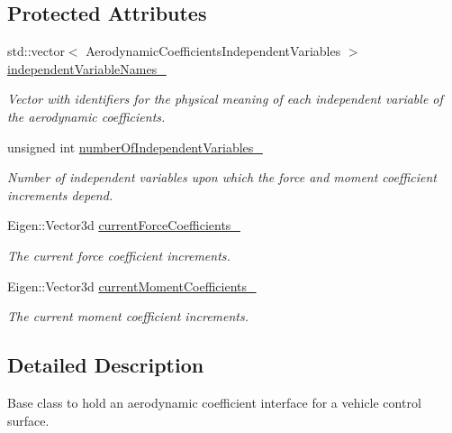 \subsection*{Protected Attributes}
\begin{DoxyCompactItemize}
\item 
std\+::vector$<$ Aerodynamic\+Coefficients\+Independent\+Variables $>$ \hyperlink{classtudat_1_1aerodynamics_1_1ControlSurfaceIncrementAerodynamicInterface_add6d7eb16644057489243d5fbdbbf3cb}{independent\+Variable\+Names\+\_\+}\hypertarget{classtudat_1_1aerodynamics_1_1ControlSurfaceIncrementAerodynamicInterface_add6d7eb16644057489243d5fbdbbf3cb}{}\label{classtudat_1_1aerodynamics_1_1ControlSurfaceIncrementAerodynamicInterface_add6d7eb16644057489243d5fbdbbf3cb}

\begin{DoxyCompactList}\small\item\em Vector with identifiers for the physical meaning of each independent variable of the aerodynamic coefficients. \end{DoxyCompactList}\item 
unsigned int \hyperlink{classtudat_1_1aerodynamics_1_1ControlSurfaceIncrementAerodynamicInterface_ac8d30947065270db44a70ba9344236c2}{number\+Of\+Independent\+Variables\+\_\+}
\begin{DoxyCompactList}\small\item\em Number of independent variables upon which the force and moment coefficient increments depend. \end{DoxyCompactList}\item 
Eigen\+::\+Vector3d \hyperlink{classtudat_1_1aerodynamics_1_1ControlSurfaceIncrementAerodynamicInterface_ab7c7dfdd3e7190abac6021345145bc34}{current\+Force\+Coefficients\+\_\+}
\begin{DoxyCompactList}\small\item\em The current force coefficient increments. \end{DoxyCompactList}\item 
Eigen\+::\+Vector3d \hyperlink{classtudat_1_1aerodynamics_1_1ControlSurfaceIncrementAerodynamicInterface_a940f44e0431811d8a3c1832aca5f7015}{current\+Moment\+Coefficients\+\_\+}
\begin{DoxyCompactList}\small\item\em The current moment coefficient increments. \end{DoxyCompactList}\end{DoxyCompactItemize}


\subsection{Detailed Description}
Base class to hold an aerodynamic coefficient interface for a vehicle control surface. 

